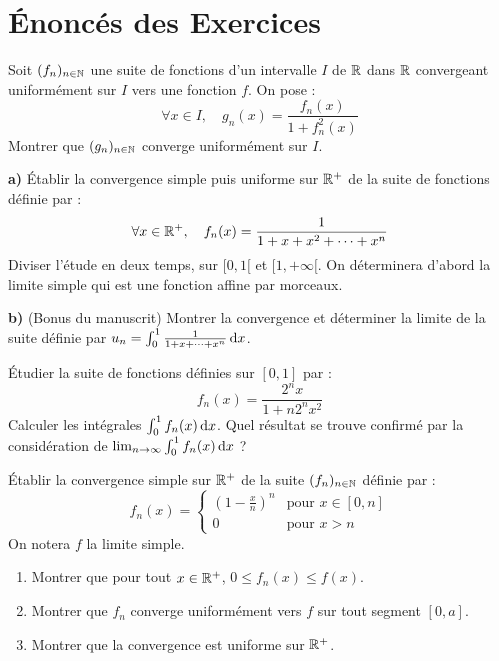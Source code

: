 

\section{Énoncés des Exercices}

\begin{exercice}
Soit $(f_n)_{n\in\mathbb{N}}$ une suite de fonctions d'un intervalle $I$ de $\mathbb{R}$ dans $\mathbb{R}$ convergeant uniformément sur $I$ vers une fonction $f$.
On pose :
$$ \forall x \in I, \quad g_n(x) = \frac{f_n(x)}{1+f_n^2(x)} $$
Montrer que $(g_n)_{n\in\mathbb{N}}$ converge uniformément sur $I$.
\end{exercice}

\begin{exercice}
\textbf{a)} Établir la convergence simple puis uniforme sur $\mathbb{R}^+$ de la suite de fonctions définie par :
$$ \forall x \in \mathbb{R}^+, \quad f_n(x) = \frac{1}{1+x+x^2+\dots+x^n} $$
Diviser l'étude en deux temps, sur $[0, 1[$ et $[1, +\infty[$. On déterminera d'abord la limite simple qui est une fonction affine par morceaux.

\textbf{b)} (Bonus du manuscrit) Montrer la convergence et déterminer la limite de la suite définie par $u_n = \int_0^1 \frac{1}{1+x+\dots+x^n} \,\mathrm{d}x$.
\end{exercice}

\begin{exercice}
Étudier la suite de fonctions définies sur $[0, 1]$ par :
$$ f_n(x) = \frac{2^n x}{1+n 2^n x^2} $$
Calculer les intégrales $\int_0^1 f_n(x) \,\mathrm{d}x$. Quel résultat se trouve confirmé par la considération de $\lim_{n\to\infty} \int_0^1 f_n(x) \,\mathrm{d}x$ ?
\end{exercice}

\begin{exercice}
Établir la convergence simple sur $\mathbb{R}^+$ de la suite $(f_n)_{n\in\mathbb{N}}$ définie par :
$$ f_n(x) = \begin{cases} (1-\frac{x}{n})^n & \text{pour } x \in [0, n] \\ 0 & \text{pour } x > n \end{cases} $$
On notera $f$ la limite simple.
\begin{enumerate}
    \item Montrer que pour tout $x \in \mathbb{R}^+$, $0 \le f_n(x) \le f(x)$.
    \item Montrer que $f_n$ converge uniformément vers $f$ sur tout segment $[0, a]$.
    \item Montrer que la convergence est uniforme sur $\mathbb{R}^+$.
\end{enumerate}
\end{exercice}

